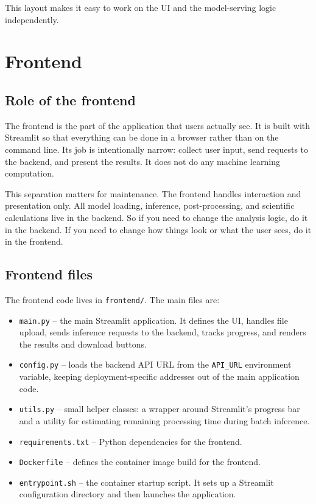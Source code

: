 \documentclass{article}
\begin{document}
This layout makes it easy to work on the UI and the model-serving logic independently.

\section{Frontend}

\subsection{Role of the frontend}

The frontend is the part of the application that users actually see. It is built with Streamlit so that everything can be done in a browser rather than on the command line. Its job is intentionally narrow: collect user input, send requests to the backend, and present the results. It does not do any machine learning computation.

This separation matters for maintenance. The frontend handles interaction and presentation only. All model loading, inference, post-processing, and scientific calculations live in the backend. So if you need to change the analysis logic, do it in the backend. If you need to change how things look or what the user sees, do it in the frontend.

\subsection{Frontend files}

The frontend code lives in \texttt{frontend/}. The main files are:

\begin{itemize}
    \item \texttt{main.py} -- the main Streamlit application. It defines the UI, handles file upload, sends inference requests to the backend, tracks progress, and renders the results and download buttons.
    \item \texttt{config.py} -- loads the backend API URL from the \texttt{API\_URL} environment variable, keeping deployment-specific addresses out of the main application code.
    \item \texttt{utils.py} -- small helper classes: a wrapper around Streamlit's progress bar and a utility for estimating remaining processing time during batch inference.
    \item \texttt{requirements.txt} -- Python dependencies for the frontend.
    \item \texttt{Dockerfile} -- defines the container image build for the frontend.
    \item \texttt{entrypoint.sh} -- the container startup script. It sets up a Streamlit configuration directory and then launches the application.
\end{itemize}
\end{document}
